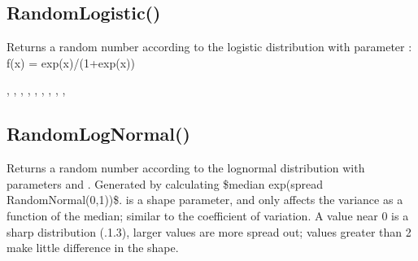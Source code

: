 \documentclass[letterpaper,10pt,english]{sphinxmanual}
\begin{document}
\subsection{RandomLogistic()}
\label{\detokenize{reference/peblmath:randomlogistic}}
\sphinxAtStartPar
{}

\sphinxAtStartPar
Returns a random number according to the logistic distribution                  with parameter : f(x) = exp(x)/(1+exp(x))

\sphinxAtStartPar
{}

\begin{sphinxVerbatim}[commandchars=\\\{\}]
\end{sphinxVerbatim}

\sphinxAtStartPar
{}

\sphinxAtStartPar
{}, , ,            , , ,               , , , 


\subsection{RandomLogNormal()}
\label{\detokenize{reference/peblmath:randomlognormal}}
\sphinxAtStartPar
{}

\sphinxAtStartPar
Returns a random number according to the log\sphinxhyphen{}normal             distribution with parameters  and . Generated           by calculating \$median \sphinxcode{\sphinxupquote{*}} exp(spread \sphinxcode{\sphinxupquote{*}} RandomNormal(0,1))\$.               is a shape parameter, and only affects the variance                as a function of the median; similar to the coefficient of              variation.  A value near 0 is a sharp distribution (.1\sphinxhyphen{}.3),             larger values are more spread out; values greater than 2 make           little difference in the shape.
\end{document}
